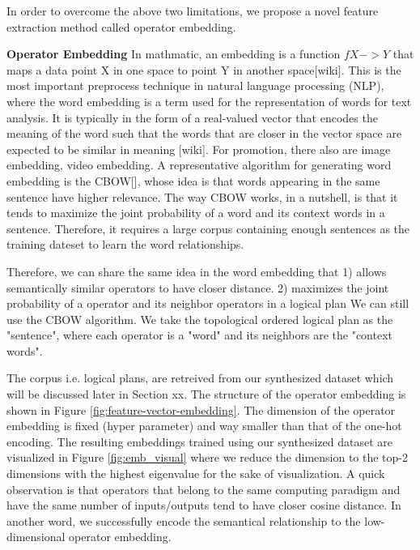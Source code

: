 In order to overcome the above two limitations, we propose a novel feature extraction method called operator embedding.

\textbf{Operator Embedding}
In mathmatic, an embedding is a function $f X -> Y$ that maps a data point X in one space to point Y in another space[wiki]. 
This is the most important preprocess technique in natural language processing (NLP), where the word embedding is a term used for the representation of words for text analysis. 
It is typically in the form of a real-valued vector that encodes the meaning of the word such that the words that are closer in the vector space are expected to be similar in meaning [wiki]. 
For promotion, there also are image embedding, video embedding. 
A representative algorithm for generating word embedding is the CBOW[], whose idea is that words appearing in the same sentence have higher relevance. 
The way CBOW works, in a nutshell, is that it tends to maximize the joint probability of a word and its context words in a sentence. 
Therefore, it requires a large corpus containing enough sentences as the training dateset to learn the word relationships.

Therefore, we can share the same idea in the word embedding that 
1) allows semantically similar operators to have closer distance. 
2) maximizes the joint probability of a operator and its neighbor operators in a logical plan
We can still use the CBOW algorithm.
We take the topological ordered logical plan as the "sentence", where each operator is a "word" and its neighbors are the "context words". 

The corpus i.e. logical plans, are retreived from our synthesized dataset which will be discussed later in Section xx.
The structure of the operator embedding is shown in Figure \ref{fig:feature-vector-embedding}. 
The dimension of the operator embedding is fixed (hyper parameter) and way smaller than that of the one-hot encoding.
The resulting embeddings trained using our synthesized dataset are visualized in Figure \ref{fig:emb_visual} where we reduce the dimension to the top-2 dimensions with the highest eigenvalue for the sake of visualization. 
A quick observation is that operators that belong to the same computing paradigm and have the same number of inputs/outputs tend to have closer cosine distance. 
In another word, we successfully encode the semantical relationship to the low-dimensional operator embedding.

